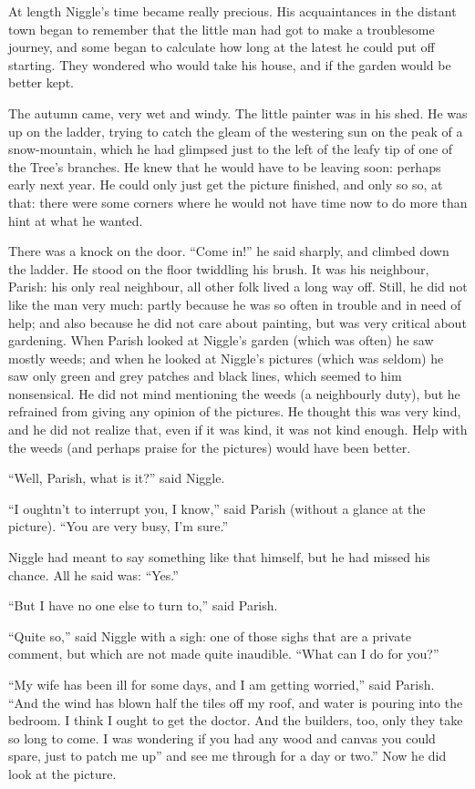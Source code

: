 \documentclass[english]{scrartcl}
\begin{document}
At length Niggle’s time became really precious. His acquaintances in the distant town began to remember that the little man had got to make a troublesome journey, and some began to calculate how long at the latest he could put off starting. They wondered who would take his house, and if the garden would be better kept.

The autumn came, very wet and windy. The little painter was in his shed. He was up on the ladder, trying to catch the gleam of the westering sun on the peak of a snow-mountain, which he had glimpsed just to the left of the leafy tip of one of the Tree’s branches. He knew that he would have to be leaving soon: perhaps early next year. He could only just get the picture finished, and only so so, at that: there were some corners where he would not have time now to do more than hint at what he wanted.

There was a knock on the door. “Come in!” he said sharply, and climbed down the ladder. He stood on the floor twiddling his brush. It was his neighbour, Parish: his only real neighbour, all other folk lived a long way off. Still, he did not like the man very much: partly because he was so often in trouble and in need of help; and also because he did not care about painting, but was very critical about gardening. When Parish looked at Niggle’s garden (which was often) he saw mostly weeds; and when he looked at Niggle’s pictures (which was seldom) he saw only green and grey patches and black lines, which seemed to him nonsensical. He did not mind mentioning the weeds (a neighbourly duty), but he refrained from giving any opinion of the pictures. He thought this was very kind, and he did not realize that, even if it was kind, it was not kind enough. Help with the weeds (and perhaps praise for the pictures) would have been better.

“Well, Parish, what is it?” said Niggle.

“I oughtn’t to interrupt you, I know,” said Parish (without a glance at the picture). “You are very busy, I’m sure.”

Niggle had meant to say something like that himself, but he had missed his chance. All he said was: “Yes.”

“But I have no one else to turn to,” said Parish.

“Quite so,” said Niggle with a sigh: one of those sighs that are a private comment, but which are not made quite inaudible. “What can I do for you?”

“My wife has been ill for some days, and I am getting worried,” said Parish. “And the wind has blown half the tiles off my roof, and water is pouring into the bedroom. I think I ought to get the doctor. And the builders, too, only they take so long to come. I was wondering if you had any wood and canvas you could spare, just to patch me up” and see me through for a day or two.” Now he did look at the picture.
\end{document}

